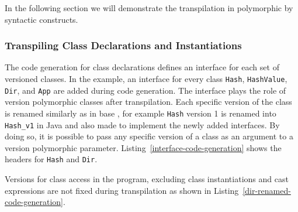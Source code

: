 In the following section we will demonstrate the transpilation in polymorphic \lang{} by syntactic constructs.

\subsubsection*{Transpiling Class Declarations and Instantiations}

The code generation for class declarations defines an interface for each set of versioned classes. In the 
example, an interface for every class \texttt{Hash}, \texttt{HashValue}, \texttt{Dir}, and \texttt{App} are 
added during code generation. 
The interface plays the role of version polymorphic classes after transpilation.
Each specific version of the class is renamed similarly as in base \lang{}, 
for example \texttt{Hash} version 1 is renamed into \texttt{Hash\_v1} in Java 
and also made to implement the newly added interfaces. 
By doing so, it is possible to pass any specific version of a class as an argument to a version polymorphic parameter.
Listing~\ref{interface-code-generation} shows the headers for \texttt{Hash} and \texttt{Dir}.

Versions for class access in the program, excluding class instantiations and cast expressions are not fixed 
during transpilation as shown in Listing~\ref{dir-renamed-code-generation}.


